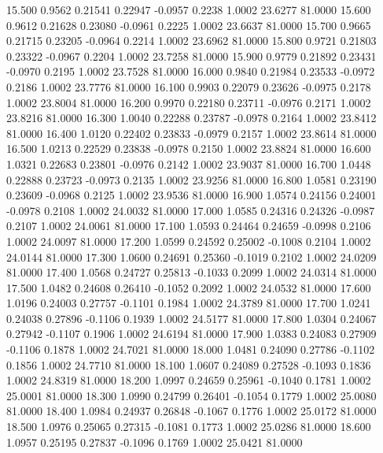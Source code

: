   15.500   0.9562   0.21541   0.22947  -0.0957   0.2238   1.0002  23.6277  81.0000
  15.600   0.9612   0.21628   0.23080  -0.0961   0.2225   1.0002  23.6637  81.0000
  15.700   0.9665   0.21715   0.23205  -0.0964   0.2214   1.0002  23.6962  81.0000
  15.800   0.9721   0.21803   0.23322  -0.0967   0.2204   1.0002  23.7258  81.0000
  15.900   0.9779   0.21892   0.23431  -0.0970   0.2195   1.0002  23.7528  81.0000
  16.000   0.9840   0.21984   0.23533  -0.0972   0.2186   1.0002  23.7776  81.0000
  16.100   0.9903   0.22079   0.23626  -0.0975   0.2178   1.0002  23.8004  81.0000
  16.200   0.9970   0.22180   0.23711  -0.0976   0.2171   1.0002  23.8216  81.0000
  16.300   1.0040   0.22288   0.23787  -0.0978   0.2164   1.0002  23.8412  81.0000
  16.400   1.0120   0.22402   0.23833  -0.0979   0.2157   1.0002  23.8614  81.0000
  16.500   1.0213   0.22529   0.23838  -0.0978   0.2150   1.0002  23.8824  81.0000
  16.600   1.0321   0.22683   0.23801  -0.0976   0.2142   1.0002  23.9037  81.0000
  16.700   1.0448   0.22888   0.23723  -0.0973   0.2135   1.0002  23.9256  81.0000
  16.800   1.0581   0.23190   0.23609  -0.0968   0.2125   1.0002  23.9536  81.0000
  16.900   1.0574   0.24156   0.24001  -0.0978   0.2108   1.0002  24.0032  81.0000
  17.000   1.0585   0.24316   0.24326  -0.0987   0.2107   1.0002  24.0061  81.0000
  17.100   1.0593   0.24464   0.24659  -0.0998   0.2106   1.0002  24.0097  81.0000
  17.200   1.0599   0.24592   0.25002  -0.1008   0.2104   1.0002  24.0144  81.0000
  17.300   1.0600   0.24691   0.25360  -0.1019   0.2102   1.0002  24.0209  81.0000
  17.400   1.0568   0.24727   0.25813  -0.1033   0.2099   1.0002  24.0314  81.0000
  17.500   1.0482   0.24608   0.26410  -0.1052   0.2092   1.0002  24.0532  81.0000
  17.600   1.0196   0.24003   0.27757  -0.1101   0.1984   1.0002  24.3789  81.0000
  17.700   1.0241   0.24038   0.27896  -0.1106   0.1939   1.0002  24.5177  81.0000
  17.800   1.0304   0.24067   0.27942  -0.1107   0.1906   1.0002  24.6194  81.0000
  17.900   1.0383   0.24083   0.27909  -0.1106   0.1878   1.0002  24.7021  81.0000
  18.000   1.0481   0.24090   0.27786  -0.1102   0.1856   1.0002  24.7710  81.0000
  18.100   1.0607   0.24089   0.27528  -0.1093   0.1836   1.0002  24.8319  81.0000
  18.200   1.0997   0.24659   0.25961  -0.1040   0.1781   1.0002  25.0001  81.0000
  18.300   1.0990   0.24799   0.26401  -0.1054   0.1779   1.0002  25.0080  81.0000
  18.400   1.0984   0.24937   0.26848  -0.1067   0.1776   1.0002  25.0172  81.0000
  18.500   1.0976   0.25065   0.27315  -0.1081   0.1773   1.0002  25.0286  81.0000
  18.600   1.0957   0.25195   0.27837  -0.1096   0.1769   1.0002  25.0421  81.0000
